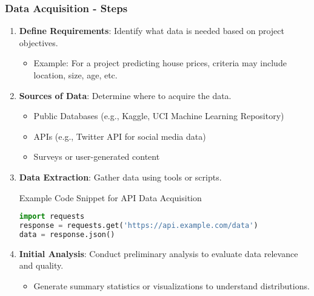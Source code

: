 \documentclass[aspectratio=169]{beamer}
\begin{document}
\begin{frame}[fragile]
    \frametitle{Data Acquisition - Steps}
    \begin{enumerate}
        \item \textbf{Define Requirements}: Identify what data is needed based on project objectives.
        \begin{itemize}
            \item Example: For a project predicting house prices, criteria may include location, size, age, etc.
        \end{itemize}
        
        \item \textbf{Sources of Data}: Determine where to acquire the data.
        \begin{itemize}
            \item Public Databases (e.g., Kaggle, UCI Machine Learning Repository)
            \item APIs (e.g., Twitter API for social media data)
            \item Surveys or user-generated content
        \end{itemize}
        
        \item \textbf{Data Extraction}: Gather data using tools or scripts.
        \begin{block}{Example Code Snippet for API Data Acquisition}
            \begin{lstlisting}[language=Python]
import requests
response = requests.get('https://api.example.com/data')
data = response.json()
            \end{lstlisting}
        \end{block}
        
        \item \textbf{Initial Analysis}: Conduct preliminary analysis to evaluate data relevance and quality.
        \begin{itemize}
            \item Generate summary statistics or visualizations to understand distributions.
        \end{itemize}
    \end{enumerate}
\end{frame}
\end{document}
